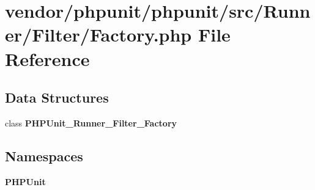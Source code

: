 \section{vendor/phpunit/phpunit/src/\+Runner/\+Filter/\+Factory.php File Reference}
\label{phpunit_2phpunit_2src_2_runner_2_filter_2_factory_8php}
\subsection*{Data Structures}
\begin{DoxyCompactItemize}
\item 
class {\bf P\+H\+P\+Unit\+\_\+\+Runner\+\_\+\+Filter\+\_\+\+Factory}
\end{DoxyCompactItemize}
\subsection*{Namespaces}
\begin{DoxyCompactItemize}
\item 
 {\bf P\+H\+P\+Unit}
\end{DoxyCompactItemize}

